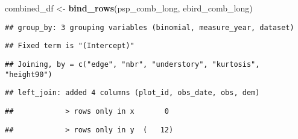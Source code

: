 \documentclass[
]{article}
\newenvironment{Shaded}{\begin{snugshade}}{\end{snugshade}}
\newcommand{\DataTypeTok}[1]{\textcolor[rgb]{0.13,0.29,0.53}{#1}}
\newcommand{\KeywordTok}[1]{\textcolor[rgb]{0.13,0.29,0.53}{\textbf{#1}}}
\newcommand{\NormalTok}[1]{#1}
\newcommand{\OperatorTok}[1]{\textcolor[rgb]{0.81,0.36,0.00}{\textbf{#1}}}
\newcommand{\StringTok}[1]{\textcolor[rgb]{0.31,0.60,0.02}{#1}}
\begin{document}
\begin{Shaded}
\begin{Highlighting}[]
\NormalTok{combined_df <-}\StringTok{ }\KeywordTok{bind_rows}\NormalTok{(psp_comb_long, ebird_comb_long)}
\end{Highlighting}
\end{Shaded}

\begin{Shaded}
\end{Shaded}

\begin{verbatim}
## group_by: 3 grouping variables (binomial, measure_year, dataset)
\end{verbatim}

\begin{Shaded}
\end{Shaded}

\begin{verbatim}
## Fixed term is "(Intercept)"
\end{verbatim}

\begin{verbatim}
## Joining, by = c("edge", "nbr", "understory", "kurtosis", "height90")
\end{verbatim}

\begin{verbatim}
## left_join: added 4 columns (plot_id, obs_date, obs, dem)
\end{verbatim}

\begin{verbatim}
##            > rows only in x       0
\end{verbatim}

\begin{verbatim}
##            > rows only in y  (   12)
\end{verbatim}
\end{document}

